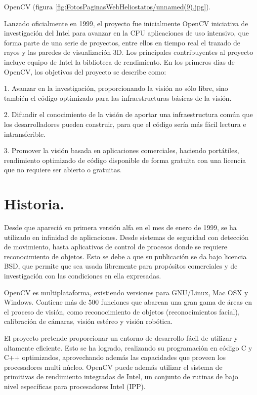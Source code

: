 OpenCV (figura \ref{fig:FotosPaginasWebHeliostatos/unnamed(9).jpg}).

Lanzado oficialmente en 1999, el proyecto fue inicialmente OpenCV iniciativa de investigación del Intel para avanzar en la CPU aplicaciones de uso intensivo, que forma parte de una serie de proyectos, entre ellos en tiempo real el trazado de rayos y las paredes de visualización 3D. Los principales contribuyentes al proyecto incluye equipo de Intel la biblioteca de rendimiento. En los primeros días de OpenCV, los objetivos del proyecto se describe como:

1. Avanzar en la investigación, proporcionando la visión no sólo libre, sino también el código optimizado para las infraestructuras básicas de la visión.

2. Difundir el conocimiento de la visión de aportar una infraestructura común que los desarrolladores pueden construir, para que el código sería más fácil lectura e intransferible.

3. Promover la visión basada en aplicaciones comerciales, haciendo portátiles, rendimiento optimizado de código disponible de forma gratuita con una licencia que no requiere ser abierto o gratuitas.

\section{Historia.}

Desde que apareció su primera versión alfa en el mes de enero de 1999, se ha utilizado en infinidad de aplicaciones. Desde sistemas de seguridad con detección de movimiento, hasta aplicativos de control de procesos donde se requiere reconocimiento de objetos. Esto se debe a que su publicación se da bajo licencia BSD, que permite que sea usada libremente para propósitos comerciales y de investigación con las condiciones en ella expresadas.

OpenCV es multiplataforma, existiendo versiones para GNU/Linux, Mac OSX y Windows. Contiene más de 500 funciones que abarcan una gran gama de áreas en el proceso de visión, como reconocimiento de objetos (reconocimientos facial), calibración de cámaras, visión estéreo y visión robótica.

El proyecto pretende proporcionar un entorno de desarrollo fácil de utilizar y altamente eficiente. Esto se ha logrado, realizando su programación en código C y C++ optimizados, aprovechando además las capacidades que proveen los procesadores multi núcleo. OpenCV puede además utilizar el sistema de primitivas de rendimiento integradas de Intel, un conjunto de rutinas de bajo nivel específicas para procesadores Intel (IPP).

